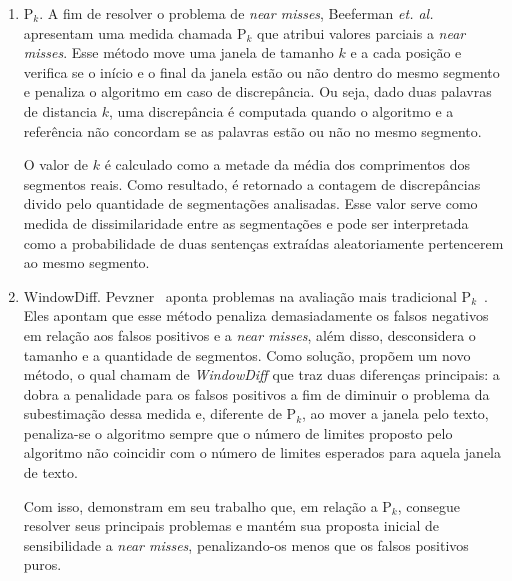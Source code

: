 \begin{enumerate}
	\item P$_k$. A fim de resolver o problema de \textit{near misses}, Beeferman \textit{et. al.}~\cite{Beeferman1999} apresentam uma medida chamada P$_k$ que atribui valores parciais a \textit{near misses}. Esse método move uma janela de tamanho $k$ e a cada posição e verifica se o início e o final da janela estão ou não dentro do mesmo segmento e penaliza o algoritmo em caso de discrepância. Ou seja, dado duas palavras de distancia $k$, uma discrepância é computada quando o algoritmo e a referência não concordam se as palavras estão ou não no mesmo segmento.

O valor de $k$ é calculado como a metade da média dos comprimentos dos segmentos reais. Como resultado, é retornado a contagem de discrepâncias divido pelo quantidade de segmentações analisadas. Esse valor serve como medida de dissimilaridade entre as segmentações e pode ser interpretada como a probabilidade de duas sentenças extraídas aleatoriamente pertencerem ao mesmo segmento.

\item WindowDiff. Pevzner~\cite{Pevzner2002} aponta problemas na avaliação mais tradicional P$_k$~\cite{Beeferman1999}. Eles apontam que esse método penaliza demasiadamente os falsos negativos em relação aos falsos positivos e a \textit{near misses}, além disso, desconsidera o tamanho e a quantidade de segmentos. Como solução, propõem um novo método, o qual chamam de \textit{WindowDiff} que traz duas diferenças principais: a dobra a penalidade para os falsos positivos a fim de diminuir o problema da subestimação dessa medida e, diferente de P$_k$, ao mover a janela pelo texto, penaliza-se o algoritmo sempre que o número de limites proposto pelo algoritmo não coincidir com o número de limites esperados para aquela janela de texto. 

Com isso, demonstram em seu trabalho que, em relação a P$_k$, consegue resolver seus principais problemas e mantém sua proposta inicial de sensibilidade a \textit{near misses}, penalizando-os menos que os falsos positivos puros.


\end{enumerate}



%	

%
%

	 






